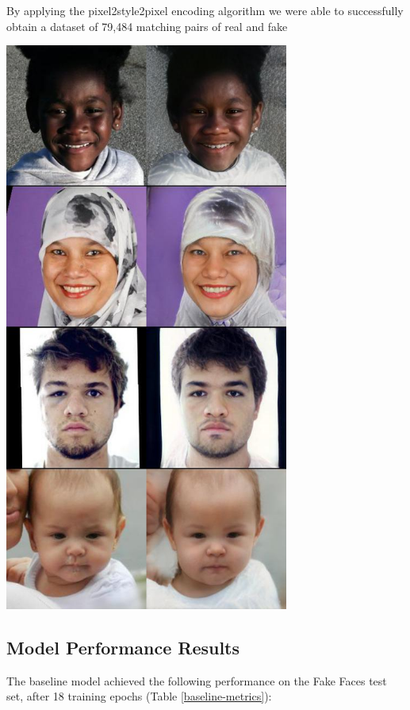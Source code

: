 \documentclass[11pt, letterpaper]{article}
\newenvironment{Figure}
  {\par\medskip\noindent\minipage{\linewidth}}
  {\endminipage\par\medskip}
\begin{document}
\begin{multicols}{2}
  By applying the pixel2style2pixel encoding algorithm we were able to
  successfully obtain a dataset of 79,484 matching pairs of real and fake

  \begin{Figure}
    \centering
    \includegraphics[width=0.7\textwidth]{figures/fair2fake.jpg}
    \label{fair2fake}
  \end{Figure}

  \subsection{Model Performance Results}

  The baseline model achieved the following performance on the Fake Faces test
  set, after 18 training epochs (Table \ref{baseline-metrics}):


\end{multicols}
\end{document}
